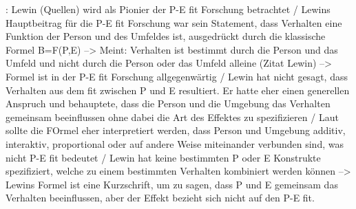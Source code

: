 \cite[S. 8]{edwards:2008}: Lewin (Quellen) wird als Pionier der P-E fit Forschung betrachtet / Lewins Hauptbeitrag für die P-E fit Forschung war sein Statement, dass Verhalten eine Funktion der Person und des Umfeldes ist, ausgedrückt durch die klassische Formel B=F(P,E) --> Meint: Verhalten ist bestimmt durch die Person und das Umfeld und nicht durch die Person oder das Umfeld alleine (Zitat Lewin) --> Formel ist in der P-E fit Forschung allgegenwärtig / Lewin hat nicht gesagt, dass Verhalten aus dem fit zwischen P und E resultiert. Er hatte eher einen generellen Anspruch und behauptete, dass die Person und die Umgebung das Verhalten gemeinsam beeinflussen ohne dabei die Art des Effektes zu spezifizieren / Laut \textcite{schneider:2001} sollte die FOrmel eher interpretiert werden, dass Person und Umgebung additiv, interaktiv, proportional oder auf andere Weise miteinander verbunden sind, was nicht P-E fit bedeutet / Lewin hat keine bestimmten P oder E Konstrukte spezifiziert, welche zu einem bestimmten Verhalten kombiniert werden können --> Lewins Formel ist eine Kurzschrift, um zu sagen, dass P und E gemeinsam das Verhalten beeinflussen, aber der Effekt bezieht sich nicht auf den P-E fit. 

